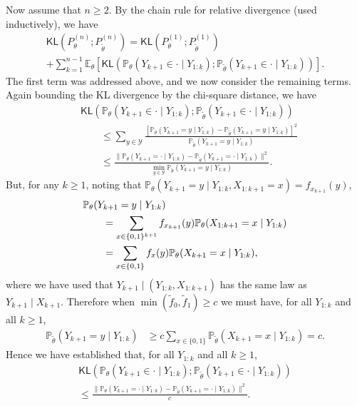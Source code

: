 \documentclass[journal]{IEEEtran}
\newcommand{\1}{\boldsymbol{1}}
\newcommand{\EE}{\mathbb{E}}
\newcommand{\PP}{\mathbb{P}}
\newcommand{\KL}{\mathsf{KL}}
\begin{document}
 Now assume that $n\geq 2$. By the chain rule for relative divergence (used inductively), we have
 \begin{multline}
	\label{eq:kl:11}
	\KL(P_{\theta}^{(n)};P_{\tilde{\theta}}^{(n)})
	= \KL(P_{\theta}^{(1)};P_{\tilde{\theta}}^{(1)})\\%
   + \sum_{k=1}^{n-1} \EE_{\theta}[\KL(\PP_{\theta}(Y_{k+1} \in \cdot \mid Y_{1:k});\PP_{\tilde{\theta}}( Y_{k+1}\in  \cdot \mid Y_{1:k}))].
  \end{multline}
  The first term was addressed above, and we now consider the remaining terms. Again bounding the KL divergence by the chi-square distance, we have
  \begin{align*}
    &\KL(\PP_{\theta}(Y_{k+1} \in \cdot \mid Y_{1:k});\PP_{\tilde{\theta}}( Y_{k+1}\in  \cdot \mid Y_{1:k}))\\%
	&\qquad\leq%
   \sum_{y\in \mathcal{Y}} \frac{[\PP_{\theta}(Y_{k+1} = y \mid Y_{1:k})-  \PP_{\tilde{\theta}}(Y_{k+1} = y \mid Y_{1:k})]^2}{\PP_{\tilde{\theta}}(Y_{k+1} = y \mid Y_{1:k})}\\
	&\qquad\leq \frac{\|\PP_{\theta}(Y_{k+1} = \cdot \mid Y_{1:k})-  \PP_{\tilde{\theta}}(Y_{k+1} = \cdot \mid Y_{1:k}) \|^2}{\min_{y\in \mathcal{Y}} \PP_{\tilde{\theta}}(Y_{k+1} = y \mid Y_{1:k}) }.
  \end{align*}
  But, for any $k \geq 1$, noting that $\PP_{\theta}(Y_{k+1} = y \mid Y_{1:k}, X_{1:k+1} = x) = f_{x_{k+1}}(y)$,
  \begin{align}
    \notag
    &\PP_{\theta}(Y_{k+1} = y\mid Y_{1:k})\\%
	\notag
	&\qquad= \sum_{x\in \{0,1\}^{k+1}} f_{x_{k+1}}(y) \PP_{\theta}(X_{1:k+1}=x \mid Y_{1:k})\\
	\label{eq:kl:3}
	&\qquad= \sum_{x\in \{0,1\}} f_{x}(y)\PP_{\theta}(X_{k+1}=x\mid Y_{1:k}),
  \end{align}
  where we have used that $Y_{k+1} \mid (Y_{1:k},X_{1:k+1})$ has the same law as
  $Y_{k+1}\mid X_{k+1}$. Therefore when $\min(\tilde{f}_0,\tilde{f}_1) \geq c$
  we must have, for all $Y_{1:k}$ and all $k \geq 1$,
  \begin{align*}
	\PP_{\tilde{\theta}}(Y_{k+1} = y \mid Y_{1:k})%
	&\geq c \sum_{x\in \{0,1\}} \PP_{\tilde{\theta}}(X_{k+1}=x\mid Y_{1:k})%
	= c.
  \end{align*}
  Hence we have established that, for all $Y_{1:k}$ and all $k \geq 1$,
  \begin{multline}
	\label{eq:kl:13}
	\KL(\PP_{\theta}(Y_{k+1} \in \cdot \mid Y_{1:k});\PP_{\tilde{\theta}}( Y_{k+1}\in  \cdot \mid Y_{1:k}))\\%
	\leq \frac{\|\PP_{\theta}(Y_{k+1} = \cdot \mid Y_{1:k})-  \PP_{\tilde{\theta}}(Y_{k+1} = \cdot \mid Y_{1:k}) \|^2}{c }.
  \end{multline}
\end{document}
